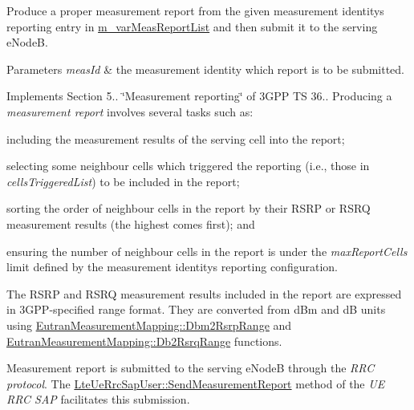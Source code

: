 Produce a proper measurement report from the given measurement identity\textquotesingle{}s reporting entry in \hyperlink{classns3_1_1LteUeRrc_a82da3c138c967761910c02b83724a0e4}{m\+\_\+var\+Meas\+Report\+List} and then submit it to the serving e\+NodeB. 


\begin{DoxyParams}{Parameters}
{\em meas\+Id} & the measurement identity which report is to be submitted.\\
\hline
\end{DoxyParams}
Implements Section 5.. \char`\"{}\+Measurement reporting\char`\"{} of 3\+G\+PP TS 36.. Producing a {\itshape measurement report} involves several tasks such as\+:
\begin{DoxyItemize}
\item including the measurement results of the serving cell into the report;
\item selecting some neighbour cells which triggered the reporting (i.\+e., those in {\itshape cells\+Triggered\+List}) to be included in the report;
\item sorting the order of neighbour cells in the report by their R\+S\+RP or R\+S\+RQ measurement results (the highest comes first); and
\item ensuring the number of neighbour cells in the report is under the {\itshape max\+Report\+Cells} limit defined by the measurement identity\textquotesingle{}s reporting configuration.
\end{DoxyItemize}

The R\+S\+RP and R\+S\+RQ measurement results included in the report are expressed in 3\+G\+P\+P-\/specified range format. They are converted from d\+Bm and dB units using \hyperlink{classns3_1_1EutranMeasurementMapping_a2c42e6628a24280f58edf8f3814b9d54}{Eutran\+Measurement\+Mapping\+::\+Dbm2\+Rsrp\+Range} and \hyperlink{classns3_1_1EutranMeasurementMapping_adcd875f25361c17646c45695b9b6e8c4}{Eutran\+Measurement\+Mapping\+::\+Db2\+Rsrq\+Range} functions.

Measurement report is submitted to the serving e\+NodeB through the {\itshape R\+RC protocol}. The \hyperlink{classns3_1_1LteUeRrcSapUser_a48beb3096e6db00ed9c0a525672e6bad}{Lte\+Ue\+Rrc\+Sap\+User\+::\+Send\+Measurement\+Report} method of the {\itshape UE R\+RC S\+AP} facilitates this submission.

